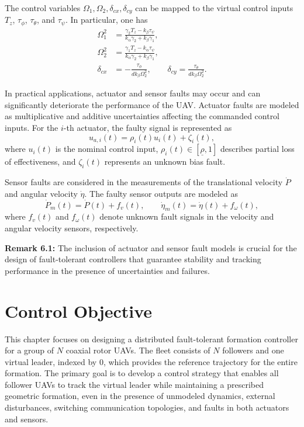 The control variables $\Omega_1, \Omega_2, \delta_{cx}, \delta_{cy}$ can be mapped to the virtual control inputs $T_z$, $\tau_\phi$, $\tau_\theta$, and $\tau_\psi$. In particular, one has
\begin{align}
\Omega_1^2 &= \frac{\gamma_2 T_z - k_\beta \tau_\psi}{k_\alpha \gamma_2 + k_\beta \gamma_1}, \\
\Omega_2^2 &= \frac{\gamma_1 T_z - k_\alpha \tau_\psi}{k_\alpha \gamma_2 + k_\beta \gamma_1}, \\
\delta_{cx} &= -\frac{\tau_\phi}{d k_\beta \Omega_2^2}, \qquad
\delta_{cy} = \frac{\tau_\theta}{d k_\beta \Omega_2^2}.
\end{align}

In practical applications, actuator and sensor faults may occur and can significantly deteriorate the performance of the UAV. Actuator faults are modeled as multiplicative and additive uncertainties affecting the commanded control inputs. For the $i$-th actuator, the faulty signal is represented as
\begin{equation}
u_{a,i}(t) = \rho_i(t) u_i(t) + \zeta_i(t),
\end{equation}
where $u_i(t)$ is the nominal control input, $\rho_i(t) \in [\underline{\rho},1]$ describes partial loss of effectiveness, and $\zeta_i(t)$ represents an unknown bias fault.

Sensor faults are considered in the measurements of the translational velocity $\dot{P}$ and angular velocity $\dot{\eta}$. The faulty sensor outputs are modeled as
\begin{equation}
\dot{P}_m(t) = \dot{P}(t) + f_v(t), \qquad \dot{\eta}_m(t) = \dot{\eta}(t) + f_\omega(t),
\end{equation}
where $f_v(t)$ and $f_\omega(t)$ denote unknown fault signals in the velocity and angular velocity sensors, respectively.

\textbf{Remark 6.1:} The inclusion of actuator and sensor fault models is crucial for the design of fault-tolerant controllers that guarantee stability and tracking performance in the presence of uncertainties and failures.

\section{Control Objective}
\label{sec:control_objective}

This chapter focuses on designing a distributed fault-tolerant formation controller for a group of $N$ coaxial rotor UAVs. The fleet consists of $N$ followers and one virtual leader, indexed by 0, which provides the reference trajectory for the entire formation. The primary goal is to develop a control strategy that enables all follower UAVs to track the virtual leader while maintaining a prescribed geometric formation, even in the presence of unmodeled dynamics, external disturbances, switching communication topologies, and faults in both actuators and sensors.

